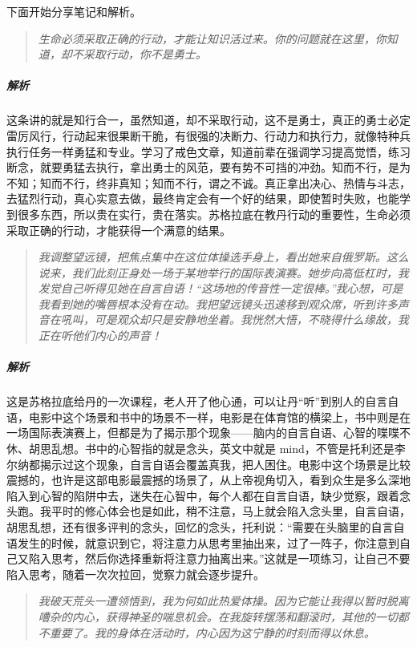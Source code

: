 下面开始分享笔记和解析。

\begin{quote}\it
    生命必须采取正确的行动，才能让知识活过来。你的问题就在这里，你知道，却不采取行动，你不是勇士。
\end{quote}

\subparagraph{解析} 这条讲的就是知行合一，虽然知道，却不采取行动，这不是勇士，真正的勇士必定雷厉风行，行动起来很果断干脆，有很强的决断力、行动力和执行力，就像特种兵执行任务一样勇猛和专业。学习了戒色文章，知道前辈在强调学习提高觉悟，练习断念，就要勇猛去执行，拿出勇士的风范，要有势不可挡的冲劲。知而不行，是为不知；知而不行，终非真知；知而不行，谓之不诚。真正拿出决心、热情与斗志，去猛烈行动，真心实意去做，最终肯定会有一个好的结果，即使暂时失败，也能学到很多东西，所以贵在实行，贵在落实。苏格拉底在教丹行动的重要性，生命必须采取正确的行动，才能获得一个满意的结果。

\begin{quote}\it
    我调整望远镜，把焦点集中在这位体操选手身上，看出她来自俄罗斯。这么说来，我们此刻正身处一场于某地举行的国际表演赛。她步向高低杠时，我发觉自己听得见她在自言自语！“这场地的传音性一定很棒。”我心想，可是我看到她的嘴唇根本没有在动。我把望远镜头迅速移到观众席，听到许多声音在吼叫，可是观众却只是安静地坐着。我恍然大悟，不晓得什么缘故，我正在听他们内心的声音！
\end{quote}

\subparagraph{解析} 这是苏格拉底给丹的一次课程，老人开了他心通，可以让丹“听”到别人的自言自语，电影中这个场景和书中的场景不一样，电影是在体育馆的横梁上，书中则是在一场国际表演赛上，但都是为了揭示那个现象——脑内的自言自语、心智的喋喋不休、胡思乱想。书中的心智指的就是念头，英文中就是 mind，不管是托利还是李尔纳都揭示过这个现象，自言自语会覆盖真我，把人困住。电影中这个场景是比较震撼的，也许是这部电影最震撼的场景了，从上帝视角切入，看到众生是多么深地陷入到心智的陷阱中去，迷失在心智中，每个人都在自言自语，缺少觉察，跟着念头跑。我平时的修心体会也是如此，稍不注意，马上就会陷入念头里，自言自语，胡思乱想，还有很多评判的念头，回忆的念头，托利说：“需要在头脑里的自言自语发生的时候，就意识到它，将注意力从思考里抽出来，过了一阵子，你注意到自己又陷入思考，然后你选择重新将注意力抽离出来。”这就是一项练习，让自己不要陷入思考，随着一次次拉回，觉察力就会逐步提升。

\begin{quote}\it
    我破天荒头一遭领悟到，我为何如此热爱体操。因为它能让我得以暂时脱离嘈杂的内心，获得神圣的喘息机会。在我旋转摆荡和翻滚时，其他的一切都不重要了。我的身体在活动时，内心因为这宁静的时刻而得以休息。
\end{quote}

